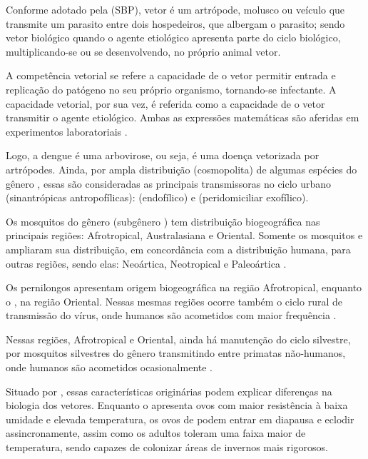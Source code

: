 \indent Conforme adotado pela  (\acrshort{SBP}), vetor é um artrópode, molusco ou veículo que transmite um parasito entre dois hospedeiros, que albergam o parasito; sendo vetor biológico quando o agente etiológico apresenta parte do ciclo biológico, multiplicando-se ou se desenvolvendo, no próprio animal vetor.

\indent A competência vetorial se refere a capacidade de o vetor permitir entrada e replicação do patógeno no seu próprio organismo, tornando-se infectante. A capacidade vetorial, por sua vez, é referida como a capacidade de o vetor transmitir o agente etiológico. Ambas as expressões matemáticas são aferidas em experimentos laboratoriais  \cite{OTPCampo}.

\indent Logo, a dengue é uma arbovirose, ou seja, é uma doença vetorizada por artrópodes. Ainda, por ampla distribuição (cosmopolita) de algumas espécies do gênero , essas são consideradas as principais transmissoras no ciclo urbano (sinantrópicas antropofílicas):  (endofílico) e   (peridomiciliar exofílico)\cite{ArboviralTransmission}.

\indent Os mosquitos do gênero  (subgênero ) tem distribuição biogeográfica nas principais regiões: Afrotropical, Australasiana e Oriental. Somente os mosquitos  e  ampliaram sua distribuição, em concordância com a distribuição humana, para outras regiões, sendo elas: Neoártica, Neotropical e Paleoártica  \cite{Valle2015Dengue}.

\indent Os pernilongos  apresentam origem biogeográfica na região Afrotropical, enquanto o , na região Oriental. Nessas mesmas regiões ocorre também o ciclo rural de transmissão do vírus, onde humanos são acometidos com maior frequência \cite{Valle2015Dengue}.

\indent Nessas regiões, Afrotropical e Oriental, ainda há manutenção do ciclo silvestre, por mosquitos silvestres do gênero  transmitindo entre primatas não-humanos, onde humanos são acometidos ocasionalmente \cite{Valle2015Dengue}.

\indent Situado por , essas características originárias podem explicar diferenças na biologia dos vetores. Enquanto o  apresenta ovos com maior resistência à baixa umidade e elevada temperatura,  os ovos de  podem entrar em diapausa e eclodir assincronamente, assim como os adultos toleram uma faixa maior de temperatura, sendo capazes de colonizar áreas de invernos mais rigorosos.

